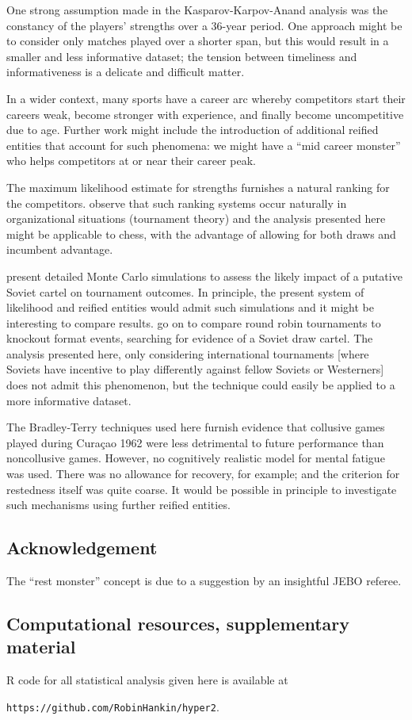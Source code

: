 \documentclass[review]{elsarticle}
\begin{document}
One strong assumption made in the
  Kasparov-Karpov-Anand analysis was the constancy of the players'
  strengths over a 36-year period.  One approach might be to consider
  only matches played over a shorter span, but this would result in a
  smaller and less informative dataset; the tension between timeliness
  and informativeness is a delicate and difficult matter.

In a wider context, many sports have a career arc
  whereby competitors start their careers weak, become stronger with
  experience, and finally become uncompetitive due to age.  Further
  work might include the introduction of additional reified entities
  that account for such phenomena: we might have a ``mid career
  monster'' who helps competitors at or near their career peak.

The maximum likelihood estimate for strengths
  furnishes a natural ranking for the competitors.  \cite{lazear1981}
  observe that such ranking systems occur naturally in organizational
  situations (tournament theory) and the analysis presented here might
  be applicable to chess, with the advantage of allowing for
  both draws and incumbent advantage.
 
\cite{moul2009} present detailed Monte Carlo simulations to assess the
likely impact of a putative Soviet cartel on tournament outcomes.  In
principle, the present system of likelihood and reified entities would
admit such simulations and it might be interesting to compare results.
\cite{moul2009} go on to compare round robin
  tournaments to knockout format events, searching for evidence of a
  Soviet draw cartel.  The analysis presented here, only considering
  international tournaments [where Soviets have incentive to play
    differently against fellow Soviets or Westerners] does not admit
  this phenomenon, but the technique could easily be applied to a more
  informative dataset.

The Bradley-Terry techniques used here furnish
  evidence that collusive games played during Cura\c{c}ao 1962 were
  less detrimental to future performance than noncollusive games.
  However, no cognitively realistic model for mental
  fatigue~\citep{boksem2008,linden2003} was used.  There was no
  allowance for recovery, for example; and the criterion for
  restedness itself was quite coarse.  It would be possible in
  principle to investigate such mechanisms using further reified
  entities.


\subsection*{Acknowledgement}

The ``rest monster'' concept is due to a suggestion by an insightful
JEBO referee.

\subsection*{Computational resources, supplementary material}

R code for all statistical analysis given here is available at

{\tt https://github.com/RobinHankin/hyper2}.


\end{document}
